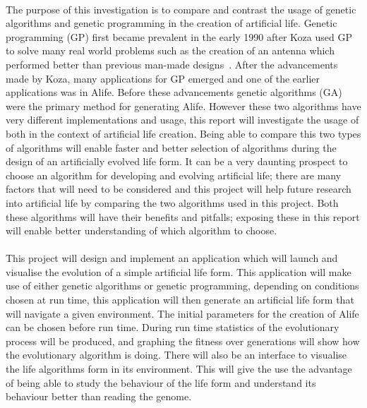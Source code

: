 \documentclass[12pt]{article}
\begin{document}
\paragraph{}
The purpose of this investigation is to compare and contrast the usage of genetic algorithms and genetic programming in the creation of artificial life.
Genetic programming (GP) first became prevalent in the early 1990 after Koza used GP to solve many real world problems such as the creation of an antenna
which performed better than previous man-made designs~\cite{koza05}. After the advancements made by Koza, many
applications for GP emerged and one of the earlier applications was in Alife. Before these advancements genetic algorithms (GA) were the primary method for generating Alife.
However these two algorithms have very different implementations and usage, this report will investigate the usage of both in the context of artificial life creation. 
Being able to compare this two types of algorithms will enable faster and better selection of algorithms during 
the design of an artificially evolved life form. It can be a very daunting prospect to choose an algorithm
for developing and evolving artificial life; there are many factors that will need to be considered and this
project will help future research into artificial life by comparing the two algorithms used in this project.
Both these algorithms will have their benefits and pitfalls; exposing these in this report will enable better understanding of which algorithm to choose.


\paragraph{}
This project will design and implement an application which will launch and visualise the evolution of a
simple artificial life form. This application will make use of either genetic algorithms or genetic programming,
depending on conditions chosen at run time, this application will then generate an artificial life form that will navigate a given environment.
The initial parameters for the creation of Alife can be chosen before run time. During run time statistics of the evolutionary process will be produced, and
graphing the fitness over generations will show how the evolutionary algorithm is doing. There will also be an interface to visualise the life  algorithms form in its
environment. This will give the use the advantage of being able to study the behaviour of the life form and understand its behaviour better
than reading the genome.
\end{document}
